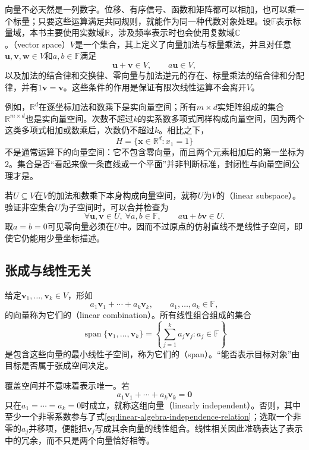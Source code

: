 向量不必天然是一列数字。位移、有序信号、函数和矩阵都可以相加，也可以乘一个标量；只要这些运算满足共同规则，就能作为同一种代数对象处理。设$\mathbb{F}$表示标量域，本书主要使用实数域$\mathbb{R}$，涉及频率表示时也会使用复数域$\mathbb{C}$。（vector space）$V$是一个集合，其上定义了向量加法与标量乘法，并且对任意$\bm{u},\bm{v},\bm{w}\in V$和$a,b\in\mathbb{F}$满足
\[
  \bm{u}+\bm{v}\in V,\qquad
  a\bm{u}\in V,
\]
以及加法的结合律和交换律、零向量与加法逆元的存在、标量乘法的结合律和分配律，并有$1\bm{v}=\bm{v}$。这些条件的作用是保证有限次线性运算不会离开$V$。

例如，$\mathbb{R}^d$在逐坐标加法和数乘下是实向量空间；所有$m\times d$实矩阵组成的集合$\mathbb{R}^{m\times d}$也是实向量空间。次数不超过$k$的实系数多项式同样构成向量空间，因为两个这类多项式相加或数乘后，次数仍不超过$k$。相比之下，
\[
  H=\{\bm{x}\in\mathbb{R}^d:x_1=1\}
\]
不是通常运算下的向量空间：它不包含零向量，而且两个元素相加后的第一坐标为$2$。集合是否“看起来像一条直线或一个平面”并非判断标准，封闭性与向量空间公理才是。

若$U\subseteq V$在$V$的加法和数乘下本身构成向量空间，就称$U$为$V$的（linear subspace）。验证非空集合$U$为子空间时，可以合并检查为
\[
  \forall \bm{u},\bm{v}\in U,\ \forall a,b\in\mathbb{F},
  \qquad a\bm{u}+b\bm{v}\in U.
\]
取$a=b=0$可见零向量必须在$U$中。因而不过原点的仿射直线不是线性子空间，即使它仍能用少量坐标描述。

\subsection{张成与线性无关}

给定$\bm{v}_1,\ldots,\bm{v}_k\in V$，形如
\[
  a_1\bm{v}_1+\cdots+a_k\bm{v}_k,
  \qquad a_1,\ldots,a_k\in\mathbb{F},
\]
的向量称为它们的（linear combination）。所有线性组合组成的集合
\[
  \operatorname{span}\{\bm{v}_1,\ldots,\bm{v}_k\}
  =
  \left\{
    \sum_{j=1}^{k}a_j\bm{v}_j:a_j\in\mathbb{F}
  \right\}
\]
是包含这些向量的最小线性子空间，称为它们的（span）。“能否表示目标对象”由目标是否属于张成空间决定。

覆盖空间并不意味着表示唯一。若
\begin{equation}
  a_1\bm{v}_1+\cdots+a_k\bm{v}_k=\bm{0} \label{eq:linear-algebra-independence-relation}
\end{equation}
只在$a_1=\cdots=a_k=0$时成立，就称这组向量（linearly independent）。否则，其中至少一个非零系数参与了式\eqref{eq:linear-algebra-independence-relation}；选取一个非零的$a_j$并移项，便能把$\bm{v}_j$写成其余向量的线性组合。线性相关因此准确表达了表示中的冗余，而不只是两个向量恰好相等。

